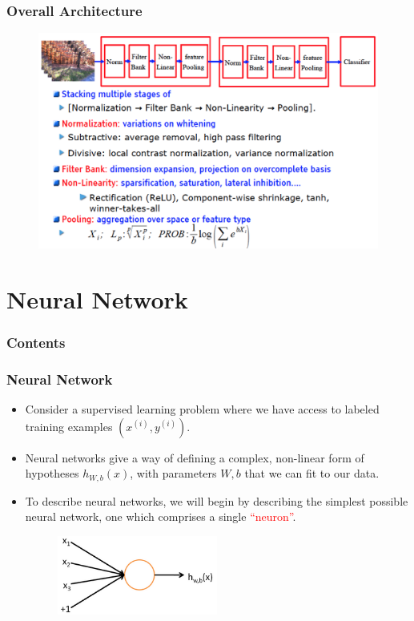 \documentclass{beamer}
\newcommand{\tr}[1]{\textcolor{red}{#1}} %
\begin{document}
\begin{frame}
\frametitle{Overall Architecture}
\begin{figure}
      \includegraphics[width=1\textwidth]{figs/intro15.png}
\end{figure}
\end{frame}

\section{Neural Network}

\begin{frame}
  \frametitle{Contents}
  \tableofcontents[currentsection]
\end{frame}

\begin{frame}
\frametitle{Neural Network}
\begin{itemize}
\item Consider a supervised learning problem where we have access to labeled training examples $(x^{(i)}, y^{(i)})$.
\item Neural networks give a way of defining a complex, non-linear form of hypotheses $h_{W,b}(x)$, with parameters $W, b$ that we can fit to our data.
\item To describe neural networks, we will begin by describing the simplest possible neural network, one which comprises a single \tr{``neuron''}. 

\begin{figure}
      \includegraphics[height=2.6cm]{figs/SingleNeuron.png}
\end{figure}


\end{itemize}
\end{frame}
\end{document}
